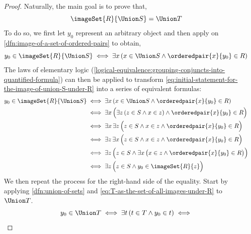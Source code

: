 \begin{proof}
    \vspace{0.3cm}
    \noindent
    Naturally, the main goal is to prove that,
    \begin{equation*}
        \imageSet{R}{\Union S} = \Union T
    \end{equation*}
    To do so, we first let \( y_{0} \) represent an arbitrary object and then apply
     on \cref{dfn:image-of-a-set-of-ordered-pairs} to obtain,
    \begin{equation}
        \label{eq:initial-statement-for-the-image-of-union-S-under-R}
        y_{0} \in \imageSet{R}{\Union S}
        \iff
        \exists x \, \mleft( x \in \Union S \land \orderedpair{x}{y_{0}} \in R \mright)
    \end{equation}
    The laws of elementary logic (\cref{logical-equivalence:grouping-conjuncts-into-quantified-formula})
    can then be applied to transform \eqref{eq:initial-statement-for-the-image-of-union-S-under-R}
    into a series of equivalent formulas:
    \begin{align}
        \label{eq:final-statement-for-the-image-of-union-S-under-R}
        y_{0} \in \imageSet{R}{\Union S}
        &\iff
        \exists x \, \mleft( x \in \Union S \land \orderedpair{x}{y_{0}} \in R \mright) \notag \\
        &\iff
        \exists x \, \Big( \exists z \, \mleft( z \in S \land x \in z \mright) \land \orderedpair{x}{y_{0}} \in R \Big) \notag \\
        &\iff
        \exists x \, \exists z \, \Big( z \in S \land x \in z \land \orderedpair{x}{y_{0}} \in R \Big) \notag \\
        &\iff
        \exists z \, \exists x \, \Big( z \in S \land x \in z \land \orderedpair{x}{y_{0}} \in R \Big) \notag \\
        &\iff
        \exists z \, \Big( z \in S \land \exists x \, \big( x \in z \land \orderedpair{x}{y_{0}} \in R \big) \Big) \notag \\
        &\iff
        \exists z \, \Big( z \in S \land y_{0} \in \imageSet{R}{z} \Big)
    \end{align}
    We then repeat the process for the right-hand side of the equality. Start by applying \cref{dfn:union-of-sets}
    and \eqref{eq:T-as-the-set-of-all-images-under-R} to \( \Union T \).
    \begin{equation*}
        y_{0} \in \Union T
        \iff
        \exists t \, \mleft( t \in T \land y_{0} \in t \mright)
        \iff

\end{equation*}
\end{proof}
